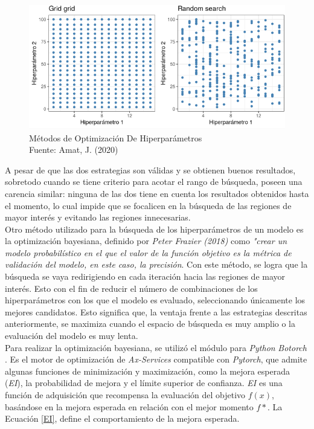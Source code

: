 \begin{figure}[ht]
	\centering
	\includegraphics[scale=0.6]{Figs/121.png}
	\caption{Métodos de Optimización De Hiperparámetros \\Fuente: Amat, J. (2020)}
	\label{fig:Hiperparámetros grid search y random search}
\end{figure}

A pesar de que las dos estrategias son válidas y se obtienen buenos resultados, sobretodo cuando se tiene criterio para acotar el rango de búsqueda, poseen una carencia similar: ninguna de las dos tiene en cuenta los resultados obtenidos hasta el momento, lo cual impide que se focalicen en la búsqueda de las regiones de mayor interés y evitando las regiones innecesarias.\\

Otro método utilizado para la búsqueda de los hiperparámetros de un modelo es la optimización bayesiana, definido por \textit{Peter Frazier (2018)} \cite{frazier2018tutorial} como \textit{"crear un modelo probabilístico en el que el valor de la función objetivo es la métrica de validación del modelo, en este caso, la precisión}. Con este método, se logra que la búsqueda se vaya redirigiendo en cada iteración hacia las regiones de mayor interés. Esto con el fin de reducir el número de combinaciones de los hiperparámetros con los que el modelo es evaluado, seleccionando únicamente los mejores candidatos. Esto significa que, la ventaja frente a las estrategias descritas anteriormente, se maximiza cuando el espacio de búsqueda es muy amplio o la evaluación del modelo es muy lenta.\\

Para realizar la optimización bayesiana, se utilizó el módulo para \textit{Python} \textit{Botorch}  \cite{balandat2020botorch}. Es el motor de optimización de \textit{Ax-Services} compatible con \textit{Pytorch}, que admite algunas funciones de minimización y maximización, como la mejora esperada (\textit{EI}), la probabilidad de mejora y el límite superior de confianza. \textit{EI} es una función de adquisición que recompensa la evaluación del objetivo $f(x)$, basándose en la mejora esperada en relación con el mejor momento $f*$. La Ecuación \ref{EI}, define el comportamiento de la mejora esperada.

